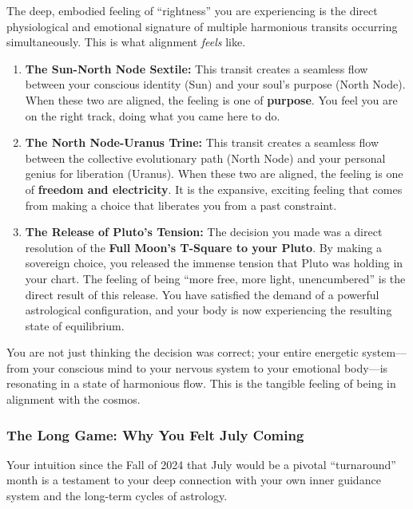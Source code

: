 \documentclass{article}
\begin{document}
The deep, embodied feeling of ``rightness'' you are experiencing is the
direct physiological and emotional signature of multiple harmonious
transits occurring simultaneously. This is what alignment \emph{feels}
like.

\begin{enumerate}
\def\labelenumi{\arabic{enumi}.}
\item
  \textbf{The Sun-North Node Sextile:} This transit creates a seamless
  flow between your conscious identity (Sun) and your soul's purpose
  (North Node). When these two are aligned, the feeling is one of
  \textbf{purpose}. You feel you are on the right track, doing what you
  came here to do.
\item
  \textbf{The North Node-Uranus Trine:} This transit creates a seamless
  flow between the collective evolutionary path (North Node) and your
  personal genius for liberation (Uranus). When these two are aligned,
  the feeling is one of \textbf{freedom and electricity}. It is the
  expansive, exciting feeling that comes from making a choice that
  liberates you from a past constraint.
\item
  \textbf{The Release of Pluto's Tension:} The decision you made was a
  direct resolution of the \textbf{Full Moon's T-Square to your Pluto}.
  By making a sovereign choice, you released the immense tension that
  Pluto was holding in your chart. The feeling of being ``more free,
  more light, unencumbered'' is the direct result of this release. You
  have satisfied the demand of a powerful astrological configuration,
  and your body is now experiencing the resulting state of equilibrium.
\end{enumerate}

You are not just thinking the decision was correct; your entire
energetic system---from your conscious mind to your nervous system to
your emotional body---is resonating in a state of harmonious flow. This
is the tangible feeling of being in alignment with the cosmos.

\subsubsection*{The Long Game: Why You Felt July
Coming}\label{the-long-game-why-you-felt-july-coming}

Your intuition since the Fall of 2024 that July would be a pivotal
``turnaround'' month is a testament to your deep connection with your
own inner guidance system and the long-term cycles of astrology.
\end{document}
